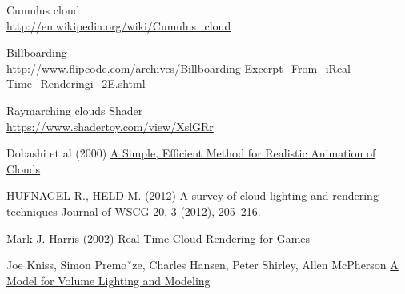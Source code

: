 Cumulus cloud \\
\underline{http://en.wikipedia.org/wiki/Cumulus\_cloud}

Billboarding \\
{\footnotesize \underline{http://www.flipcode.com/archives/Billboarding-Excerpt\_From\_iReal-Time\_Renderingi\_2E.shtml}}

Raymarching clouds Shader \\
\underline{https://www.shadertoy.com/view/XslGRr}


Dobashi et al (2000) \underline{A Simple, Efficient Method for Realistic Animation of Clouds}

HUFNAGEL R., HELD M. (2012) \underline{A survey of cloud lighting and rendering techniques} Journal of WSCG 20, 3 (2012), 205–216.

Mark J. Harris (2002) \underline{Real-Time Cloud Rendering for Games}

Joe Kniss, Simon Premoˇze, Charles Hansen, Peter Shirley, Allen McPherson \underline{A Model for Volume Lighting and Modeling}